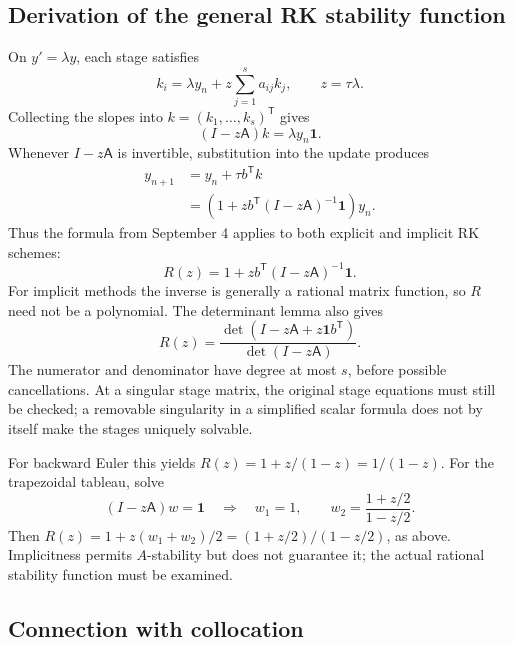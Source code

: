 \subsection{Derivation of the general RK stability function}

On \(y'=\lambda y\), each stage satisfies
\[
 k_i=\lambda y_n+z\sum_{j=1}^s a_{ij}k_j,
 \qquad z=\tau\lambda.
\]
Collecting the slopes into \(k=(k_1,\ldots,k_s)^{\mathsf T}\) gives
\[
 (I-z\mathsf A)k=\lambda y_n\mathbf1.
\]
Whenever \(I-z\mathsf A\) is invertible, substitution into the update
produces
\begin{align*}
 y_{n+1}
  &=y_n+\tau b^{\mathsf T}k\\
  &=\left(1+z b^{\mathsf T}(I-z\mathsf A)^{-1}\mathbf1\right)y_n.
\end{align*}
Thus the formula from September 4 applies to both explicit and
implicit RK schemes:
\begin{equation}\label{eq:general-rk-stability-sep-18}
 \boxed{R(z)=1+z b^{\mathsf T}(I-z\mathsf A)^{-1}\mathbf1.}
\end{equation}
For implicit methods the inverse is generally a rational matrix
function, so \(R\) need not be a polynomial. The determinant lemma
also gives
\[
 R(z)=\frac{\det(I-z\mathsf A+z\mathbf1b^{\mathsf T})}
             {\det(I-z\mathsf A)}.
\]
The numerator and denominator have degree at most \(s\), before
possible cancellations. At a singular stage matrix, the original
stage equations must still be checked; a removable singularity in a
simplified scalar formula does not by itself make the stages uniquely
solvable.

For backward Euler this yields
\(R(z)=1+z/(1-z)=1/(1-z)\). For the trapezoidal tableau, solve
\[
 (I-z\mathsf A)w=\mathbf1
 \quad\Longrightarrow\quad
 w_1=1,\qquad w_2=\frac{1+z/2}{1-z/2}.
\]
Then \(R(z)=1+z(w_1+w_2)/2=(1+z/2)/(1-z/2)\), as above.
Implicitness permits \(A\)-stability but does not guarantee it; the
actual rational stability function must be examined.

\subsection{Connection with collocation}

